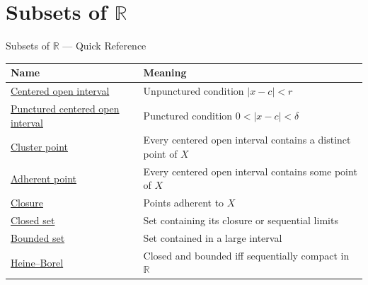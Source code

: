 \section{\texorpdfstring{Subsets of $\mathbb{R}$}{Subsets of R}}

\begin{toolkitbox}{Subsets of $\mathbb{R}$ --- Quick Reference}
\small
\begin{tabular}{l l}
\toprule
\textbf{Name} & \textbf{Meaning} \\
\midrule
\hyperref[def:epsilon-neighbourhood]{Centered open interval} & Unpunctured condition \(|x-c|<r\) \\
\hyperref[def:deleted-epsilon-neighbourhood]{Punctured centered open interval} & Punctured condition \(0<|x-c|<\delta\) \\
\hyperref[def:cluster-point-r]{Cluster point} & Every centered open interval contains a distinct point of \(X\) \\
\hyperref[def:adherent-point-r]{Adherent point} & Every centered open interval contains some point of \(X\) \\
\hyperref[def:closure-r]{Closure} & Points adherent to \(X\) \\
\hyperref[def:closed-set-r]{Closed set} & Set containing its closure or sequential limits \\
\hyperref[def:bounded-set-r]{Bounded set} & Set contained in a large interval \\
\hyperref[thm:heine-borel-subsets-real-line]{Heine--Borel} & Closed and bounded iff sequentially compact in \(\mathbb{R}\) \\
\bottomrule
\end{tabular}
\end{toolkitbox}


